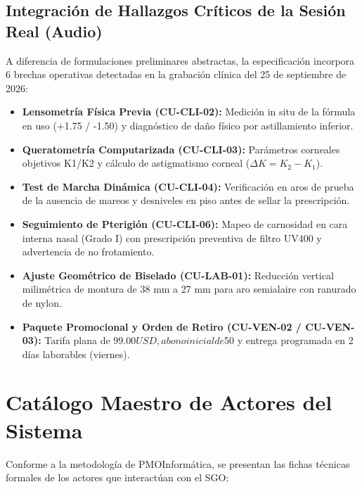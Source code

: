 \documentclass[12pt,a4paper]{report}
\begin{document}
\section{Integración de Hallazgos Críticos de la Sesión Real (Audio)}
A diferencia de formulaciones preliminares abstractas, la especificación incorpora 6 brechas operativas detectadas en la grabación clínica del 25 de septiembre de 2026:
\begin{itemize}[leftmargin=1.0cm]
    \item \textbf{Lensometría Física Previa (CU-CLI-02):} Medición in situ de la fórmula en uso (+1.75 / -1.50) y diagnóstico de daño físico por astillamiento inferior.
    \item \textbf{Queratometría Computarizada (CU-CLI-03):} Parámetros corneales objetivos K1/K2 y cálculo de astigmatismo corneal ($\Delta K = K_2 - K_1$).
    \item \textbf{Test de Marcha Dinámica (CU-CLI-04):} Verificación en aros de prueba de la ausencia de mareos y desniveles en piso antes de sellar la prescripción.
    \item \textbf{Seguimiento de Pterigión (CU-CLI-06):} Mapeo de carnosidad en cara interna nasal (Grado I) con prescripción preventiva de filtro UV400 y advertencia de no frotamiento.
    \item \textbf{Ajuste Geométrico de Biselado (CU-LAB-01):} Reducción vertical milimétrica de montura de 38 mm a 27 mm para aro semialaire con ranurado de nylon.
    \item \textbf{Paquete Promocional y Orden de Retiro (CU-VEN-02 / CU-VEN-03):} Tarifa plana de $99.00 USD, abono inicial de $50 y entrega programada en 2 días laborables (viernes).
\end{itemize}

\newpage
\chapter{Catálogo Maestro de Actores del Sistema}

Conforme a la metodología de PMOInformática, se presentan las fichas técnicas formales de los actores que interactúan con el SGO:
\end{document}
